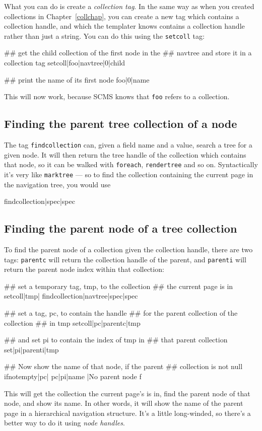 What you can do is create a \emph{collection tag}. In the same way as when you created collections
in Chapter~\ref{collchap}, you can create a new tag which contains a collection handle, and which the
templater knows contains a collection handle rather than just a string. You can do this using the
\texttt{setcoll} tag:
\begin{MyVerbatim}
## get the child collection of the first node in the
## navtree and store it in a collection tag
{{setcoll|foo|{{navtree|0|child}}}}

## print the name of its first node
{{foo|0|name}}
\end{MyVerbatim}
This will now work, because SCMS knows that \texttt{foo} refers to a collection.

\subsection{Finding the parent tree collection of a node}
The tag \texttt{findcollection} can, given a field name and a value, search a tree for a given node. It
will then return the tree handle of the collection which contains that node, so it can be walked
with \texttt{foreach}, \texttt{rendertree}
and so on. Syntactically it's very like \texttt{marktree} --- so to find the collection containing
the current page in the navigation tree, you would use
\begin{MyVerbatim}
{{findcollection|spec|{{spec}}}}
\end{MyVerbatim}

\subsection{Finding the parent node of a tree collection}
To find the parent node of a collection given the collection handle, there are two tags:
\texttt{parentc} will return the collection handle of the parent, and \texttt{parenti} will return
 the parent node index within that collection:
\begin{MyVerbatim}
## set a temporary tag, tmp, to the collection
## the current page is in
{{setcoll|tmp|
    {{findcollection|{{navtree}}|spec|{{spec}}}}}}

## set a tag, pc,  to contain the handle
## for the parent collection of the collection
## in tmp
{{setcoll|pc|{{parentc|{{tmp}}}}}}

## and set pi to contain the index of tmp in
## that parent collection
{{set|pi|{{parenti|{{tmp}}}}}}

## Now show the name of that node, if the parent
## collection is not null
{{ifnotempty|{{pc}}|
    {{pc|{{pi}}|name}}
    |No parent node
}}f
\end{MyVerbatim}
This will get the collection the current page's is in, find the parent node of that node, and show its name.
In other words, it will show the name of the parent page in a hierarchical navigation structure. It's a
little long-winded, so there's a better way to do it using \emph{node handles}.


